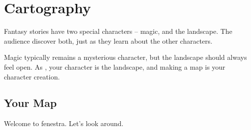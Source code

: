 \chapter[The Cartographers]{Cartography}
\label{civilization}

Fantasy stories have two special characters -- magic, and the landscape.
The audience discover both, just as they learn about the other characters.

Magic typically remains a mysterious character, but the landscape should always feel open.
As , your character is the landscape, and making a map is your character creation.

\section{Your Map}
\label{yourMap}

Welcome to \gls{fenestra}.
Let's look around.

